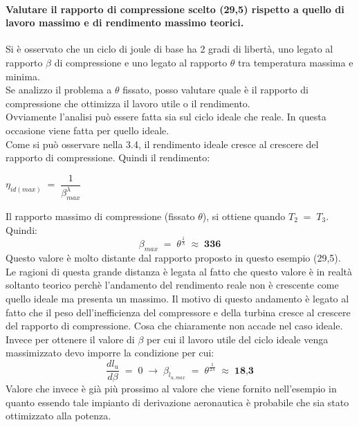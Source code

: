 \documentclass[a4paper, twoside, 12pt]{report}
\begin{document}
\paragraph{Valutare il rapporto di compressione scelto (29,5) rispetto a quello di lavoro massimo e di rendimento massimo teorici.\\}
Si è osservato che un ciclo di joule di base ha 2 gradi di libertà, uno legato al rapporto $\beta$ di compressione e uno legato al rapporto $\theta$ tra temperatura massima e minima.\\
Se analizzo il problema a $\theta$ fissato, posso valutare quale è il rapporto di compressione che ottimizza il lavoro utile o il rendimento.\\
Ovviamente l'analisi può essere fatta sia sul ciclo ideale che reale. In questa occasione viene fatta per quello ideale.\\
Come si può osservare nella 3.4, il rendimento ideale cresce al crescere del rapporto di compressione. Quindi il rendimento:
\begin{center}
	$\eta_{id(max)}\;=\;\dfrac{1}{\beta_{max}^{\lambda}}$
\end{center}
Il rapporto massimo di compressione (fissato $\theta$), si ottiene quando $T_{2}\;=\;T_{3}$. Quindi:
\begin{equation}
	\beta_{max}\;=\;\theta^{\frac{1}{\lambda}}\;\approx\;\textbf{336}
\end{equation}
Questo valore è molto distante dal rapporto proposto in questo esempio (29,5). Le ragioni di questa grande distanza è legata al fatto che questo valore è in realtà soltanto teorico perchè l'andamento del rendimento reale non è crescente come quello ideale ma presenta un massimo. Il motivo di questo andamento è legato al fatto che il peso dell'inefficienza del compressore e della turbina cresce al crescere del rapporto di compressione. Cosa che chiaramente non accade nel caso ideale.\\
Invece per ottenere il valore di $\beta$ per cui il lavoro utile del ciclo ideale venga massimizzato devo imporre la condizione per cui:
\begin{equation}
	\dfrac{dl_{u}}{d\beta}\;=\;0\;\to\;\beta_{l_{u,max}}\;=\;\theta^{\frac{1}{2\lambda}}\;\approx\;\textbf{18,3}
\end{equation}
Valore che invece è già più prossimo al valore che viene fornito nell'esempio in quanto essendo tale impianto di derivazione aeronautica è probabile che sia stato ottimizzato alla potenza.
\newpage
\end{document}
